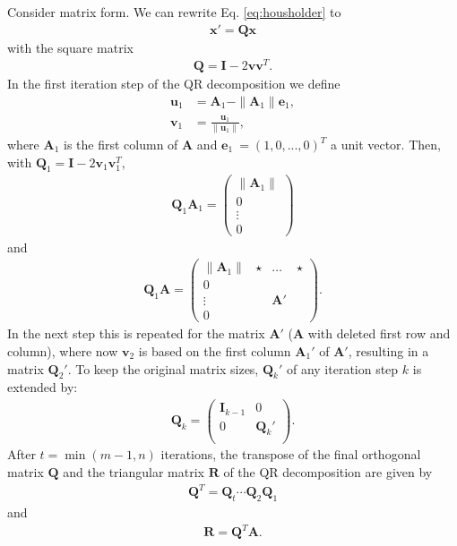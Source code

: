 \documentclass[11pt, a4paper, parskip=half*, bibliography=totoc, cleardoublepage=empty, final,
numbers=noenddot]{scrbook}
\begin{document}
Consider matrix form. We can rewrite Eq. \ref{eq:housholder} to
\begin{align}
\bm{x}' = \bm{Q} \bm{x}
\end{align}
with the square matrix
\begin{align}
\bm{Q} = \bm{I} - 2 \bm{v} \bm{v}^T.
\end{align}
In the first iteration step of the QR decomposition we define  
\begin{align}
\bm{u}_1 &= \bm{A}_1 - \| \bm{A}_1 \| \bm{e}_1,\\
\bm{v}_1 &= \frac{\bm{u}_1 }{\|\bm{u}_1 \|},
\end{align}
where $\bm{A}_1$ is the first column of $\bm{A}$ and $\bm{e}_1\ = (1, 0,  ..., 0)^T$ a unit vector. Then, with $\bm{Q}_1 = \bm{I} - 2 \bm{v}_1 \bm{v}^T_1$,
\begin{align}
\bm{Q}_1 \bm{A}_1 = \begin{pmatrix}
\| \bm{A}_1 \| \\
0 \\
\vdots\\
0
\end{pmatrix}
\end{align}
and
\begin{align}
\bm{Q}_1 \bm{A} = \begin{pmatrix}
\| \bm{A}_1 \| & \star &\hdots & \star \\
0 \\
\vdots & & \bm{A}' & \\
0
\end{pmatrix}.
\end{align}
In the next step this is repeated for the matrix $\bm{A}'$ ($\bm{A}$ with deleted first row and column), where now $\bm{v}_2$ is based on the first column $\bm{A}_1'$  of $\bm{A}'$, resulting in a matrix $\bm{Q}_2'$. To keep the original matrix sizes, $\bm{Q}_k'$ of any iteration step $k$ is extended by: 
\begin{align}
\bm{Q}_k  = \begin{pmatrix}
\bm{I}_{k-1} & 0\\
0 &  \bm{Q}_k'\\
\end{pmatrix}.
\end{align}
After $t=\min(m-1, n)$ iterations, the transpose of the final orthogonal matrix $\bm{Q}$ and the triangular matrix $\bm{R}$ of the QR decomposition are given by
\begin{align}
\bm{Q}^T  = \bm{Q}_t \cdots \bm{Q}_2 \bm{Q}_1
\end{align}
and 
\begin{align}
\bm{R}  = \bm{Q}^T \bm{A}.
\end{align}
\end{document}
